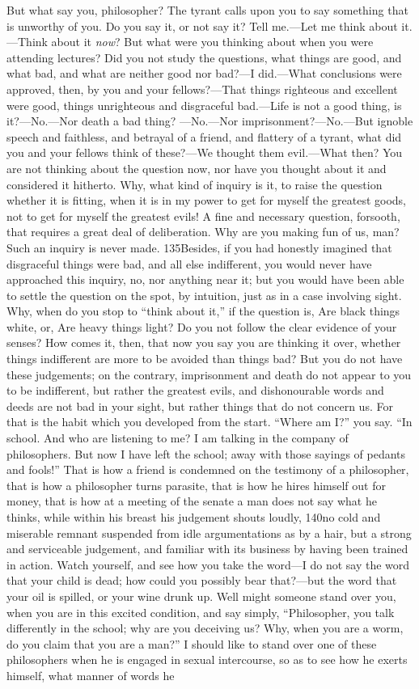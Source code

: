 But what say you, philosopher? The tyrant calls upon you to say something that is unworthy of you. Do you say it, or not say it? Tell me.—Let me think about it.—Think about it \emph{now}? But what were you thinking about when you were attending lectures? Did you not study the questions, what things are good, and what bad, and what are neither good nor bad?—I did.—What conclusions were approved, then, by you and your fellows?—That things righteous and excellent were good, things unrighteous and disgraceful bad.—Life is not a good thing, is it?—No.—Nor death a bad thing? —No.—Nor imprisonment?—No.—But ignoble speech and faithless, and betrayal of a friend, and flattery of a tyrant, what did you and your fellows think of these?—We thought them evil.—What then? You are not thinking about the question now, nor have you thought about it and considered it hitherto. Why, what kind of inquiry is it, to raise the question whether it is fitting, when it is in my power to get for myself the greatest goods, not to get for myself the greatest evils! A fine and necessary question, forsooth, that requires a great deal of deliberation. Why are you making fun of us, man? Such an inquiry is never made. 135Besides, if you had honestly imagined that disgraceful things were bad, and all else indifferent, you would never have approached this inquiry, no, nor anything near it; but you would have been able to settle the question on the spot, by intuition, just as in a case involving sight. Why, when do you stop to ``think about it,'' if the question is, Are black things white, or, Are heavy things light? Do you not follow the clear evidence of your senses? How comes it, then, that now you say you are thinking it over, whether things indifferent are more to be avoided than things bad? But you do not have these judgements; on the contrary, imprisonment and death do not appear to you to be indifferent, but rather the greatest evils, and dishonourable words and deeds are not bad in your sight, but rather things that do not concern us. For that is the habit which you developed from the start. ``Where am I?'' you say. ``In school. And who are listening to me? I am talking in the company of philosophers. But now I have left the school; away with those sayings of pedants and fools!'' That is how a friend is condemned on the testimony of a philosopher, that is how a philosopher turns parasite, that is how he hires himself out for money, that is how at a meeting of the senate a man does not say what he thinks, while within his breast his judgement shouts loudly, 140no cold and miserable remnant suspended from idle argumentations as by a hair, but a strong and serviceable judgement, and familiar with its business by having been trained in action. Watch yourself, and see how you take the word—I do not say the word that your child is dead; how could you possibly bear that?—but the word that your oil is spilled, or your wine drunk up. Well might someone stand over you, when you are in this excited condition, and say simply, ``Philosopher, you talk differently in the school; why are you deceiving us? Why, when you are a worm, do you claim that you are a man?'' I should like to stand over one of these philosophers when he is engaged in sexual intercourse, so as to see how he exerts himself, what manner of words he 